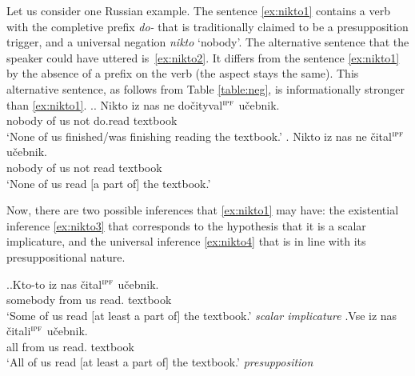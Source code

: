 Let us consider one Russian example. The sentence \ref{ex:nikto1} contains a verb with the completive prefix \textit{do-} that is traditionally claimed to be a presupposition trigger, and a universal negation \textit{nikto} `nobody'. The alternative sentence that the speaker could have uttered is~\ref{ex:nikto2}. It differs from the sentence \ref{ex:nikto1} by the absence of a prefix on the verb (the aspect stays the same). This alternative sentence, as follows from Table \ref{table:neg}, is informationally stronger than \ref{ex:nikto1}.
\ex.\label{ex:nikto}\ag. \label{ex:nikto1}Nikto iz nas ne do\v{c}ityval$^{\textsc{ipf}}$ u\v{c}ebnik.\\
nobody of us not do.read textbook\\
 `None of us finished/was finishing reading the textbook.'
\bg. \label{ex:nikto2}Nikto iz nas ne \v{c}ital$^{\textsc{ipf}}$ u\v{c}ebnik.\\
nobody of us not read textbook\\
 `None of us read $[$a part of$]$ the textbook.'

Now, there are two possible inferences that \ref{ex:nikto1} may have: the existential inference \ref{ex:nikto3} that corresponds to the hypothesis that it is a scalar implicature, and the universal inference \ref{ex:nikto4} that is in line with its presuppositional nature.

\ex.\ag.\label{ex:nikto3}Kto-to iz nas \v{c}ital$^{\textsc{ipf}}$ u\v{c}ebnik.\\
somebody from us read. textbook\\
`Some of us read $[$at least a part of$]$ the textbook.' \hfill \textit{scalar implicature}
\bg.\label{ex:nikto4}Vse iz nas \v{c}itali$^{\textsc{ipf}}$ u\v{c}ebnik.\\
all from us read. textbook\\
`All of us read $[$at least a part of$]$ the textbook.' \hfill \textit{presupposition}

